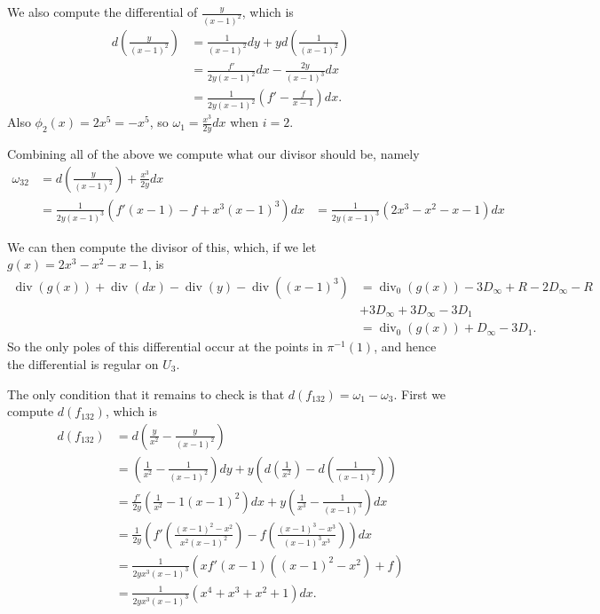 \documentclass[draft, 11pt]{article} %
\theoremstyle{plain}
\theoremstyle{remark}
\DeclareMathOperator{\di}{div}
\begin{document}
We also compute the differential of $\frac{y}{(x-1)^2}$, which is
\begin{align*}
d\left( \frac{y}{(x-1)^2} \right) & = \frac{1}{(x-1)^2}dy + y d \left( \frac{1}{(x-1)^2} \right) \\
& = \frac{f'}{2y(x-1)^2}dx - \frac{2y}{(x-1)^3}dx \\
& = \frac{1}{2y(x-1)^2} \left( f' - \frac{f}{x-1} \right) dx.
\end{align*}
Also $\phi_2(x) = 2x^5 = -x^5$, so $\omega_1 = \frac{x^3}{2y}dx$ when $i=2$.


Combining all of the above we compute what our divisor should be, namely
\begin{align*}
\omega_{32} &  = d\left( \frac{y}{(x-1)^2} \right) + \frac{x^3}{2y}dx \\
& = \frac{1}{2y(x-1)^3} \left( f'(x-1) - f + x^3(x-1)^3 \right) dx
& = \frac{1}{2y(x-1)^3}(2x^3-x^2-x-1)dx
\end{align*}
 
We can then compute the divisor of this, which, if we let $g(x) = 2x^3 - x^2 -x -1$, is
\begin{align*}
\di(g(x)) + \di( dx) - \di (y) - \di ((x-1)^3)  & =  \di_0(g(x)) - 3D_\infty + R - 2D_\infty - R  \\
& + 3D_\infty + 3D_\infty - 3D_1 \\
 & =  \di_0(g(x)) + D_\infty - 3D_1.
\end{align*}
So the only poles of this differential occur at the points in $\pi^{-1}(1)$, and hence the differential is regular on $U_3$.

The only condition that it remains to check is that $d(f_{132}) = \omega_1 - \omega_3$.
First we compute $d(f_{132})$, which is
\begin{align*}
d(f_{132})  & =  d \left( \frac{y}{x^2} - \frac{y}{(x-1)^2} \right) \\
& =  \left( \frac{1}{x^2} - \frac{1}{(x-1)^2} \right) dy + y \left( d \left( \frac{1}{x^2} \right) - d \left( \frac{1}{(x-1)^2} \right) \right) \\
&=  \frac{f'}{2y} \left( \frac{1}{x^2} - {1}{(x-1)^2} \right) dx + y \left( \frac{1}{x^3} - \frac{1}{(x-1)^3} \right) dx \\
&=  \frac{1}{2y} \left( f'\left( \frac{(x-1)^2 - x^2}{x^2(x-1)^2} \right) - f \left( \frac{(x-1)^3 - x^3}{(x-1)^3x^3} \right) \right) dx \\
&=  \frac{1}{2yx^3(x-1)^3} ( xf'(x-1)((x-1)^2-x^2) + f ) \\
&=  \frac{1}{2yx^3(x-1)^3} ( x^4 + x^3 + x^2 + 1)dx.
\end{align*}
\end{document}
